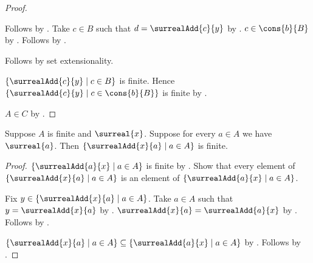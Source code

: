 \begin{proof}
\begin{subproof}
\begin{subproof}
\begin{subproof}
\begin{byCase}
                        Follows by .
                        Take $c\in B$ such that
                            $d=\surrealAdd{c}{y}$
                            by .
                        $c\in\cons{b}{B}$ by .
                        Follows by .
                \end{byCase}
            \end{subproof}
            Follows by set extensionality.
        \end{subproof}
        $\{\surrealAdd{c}{y}\mid c\in B\}$ is finite.
        Hence $\{\surrealAdd{c}{y}\mid c\in\cons{b}{B}\}$ is finite
            by .
    \end{subproof}
    $A\in C$ by .
\end{proof}

\begin{lemma}\label{finite_surreal_add_image_right}
    Suppose $A$ is finite and $\surreal{x}$.
    Suppose for every $a\in A$ we have $\surreal{a}$.
    Then $\{\surrealAdd{x}{a}\mid a\in A\}$ is finite.
\end{lemma}
\begin{proof}
    $\{\surrealAdd{a}{x}\mid a\in A\}$ is finite
        by .
    Show that every element of $\{\surrealAdd{x}{a}\mid a\in A\}$
        is an element of $\{\surrealAdd{a}{x}\mid a\in A\}$.
    \begin{subproof}
        Fix $y\in\{\surrealAdd{x}{a}\mid a\in A\}$.
        Take $a\in A$ such that $y=\surrealAdd{x}{a}$
            by .
        $\surrealAdd{x}{a}=\surrealAdd{a}{x}$ by .
        Follows by .
    \end{subproof}
    $\{\surrealAdd{x}{a}\mid a\in A\}
        \subseteq\{\surrealAdd{a}{x}\mid a\in A\}$
        by .
    Follows by .
\end{proof}

